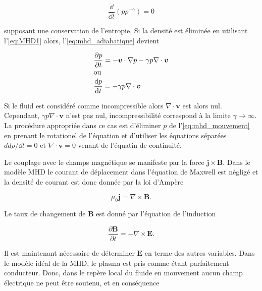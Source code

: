 \documentclass[main.tex]{subfiles}
\begin{document}
\begin{equation}
	\frac{\dd} {\dd t} \left( p \rho^{-\gamma}\right) = 0
	\label{eq:mhd_adiabatique}
\end{equation}

\noindent supposant une conservation de l'entropie.
Si la densité est éliminée en utilisant l'\autoref{eq:MHD1} alors, l'\autoref{eq:mhd_adiabatique} devient

\begin{subequations}
	\begin{align}
		&\frac{\partial p}{\partial t} = - \bm{v} \cdot \nabla p - \gamma p \nabla \cdot \bm{v} \label{eq:MHD3a}\\
		\intertext{ou}
		& \frac{\text{d} p}{\text{d} t} = - \gamma p \nabla \cdot \bm{v} \label{eq:MHD3b}
	\end{align}
	\label{eq:MHD3}
\end{subequations}

Si le fluid est considéré comme incompressible alors \( \nabla \cdot \bm{v} \) est alors nul.
Cependant, \( \gamma p \nabla \cdot \bm{v} \) n'est pas nul, incompressibilité correspond à la limite \( \gamma \rightarrow \infty \).
La procédure appropriée dans ce cas est d'éliminer \( p \) de l'\autoref{eq:mhd_mouvement} en prenant le rotationel de l'équation et d'utiliser les équations séparées \( dd \rho / \dd t = 0 \) et \( \nabla \cdot \bm{v} = 0 \) venant de l'équatin de continuité.

Le couplage avec le champs magnétique se manifeste par la force \( \bm{j} \times \bm{B} \).
Dans le modèle MHD le courant de déplacement dans l'équation de Maxwell est négligé et la densité de courant est donc donnée par la loi d'Ampère

\begin{equation}
	\mu_0 \bm{j} = \nabla \times \bm{B}.
	\label{eq:mhd_ampere}
\end{equation}

\noindent Le taux de changement de \( \bm{B} \) est donné par l'équation de l'induction

\begin{equation}
	\frac{\partial \bm{B}}{\partial t} = - \nabla \times \bm{E}.
	\label{eq:MHD_taux_B}
\end{equation}

Il est maintenant nécessaire de déterminer \( \bm{E} \) en terme des autres variables.
Dans le modèle idéal de la MHD, le plasma est pris comme étant parfaitement conducteur.
Donc, dans le repère local du fluide en mouvement aucun champ électrique ne peut être soutenu, et en conséquence
\end{document}
